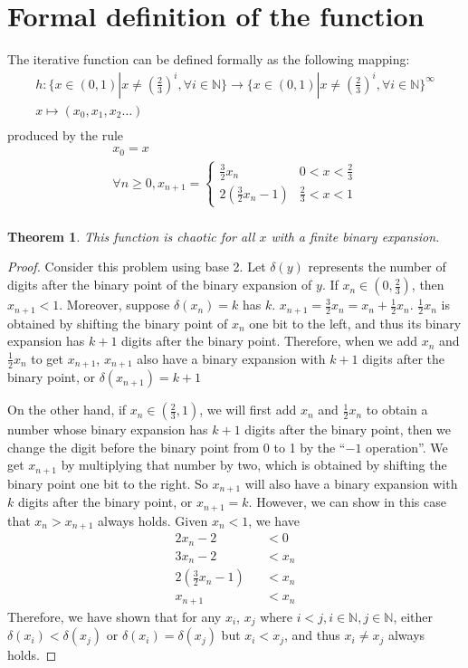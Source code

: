 \documentclass{article}
\newtheorem{theorem}{Theorem}[section]
\theoremstyle{definition}
\theoremstyle{remark}
\begin{document}
\section{Formal definition of the function}
The iterative function can be defined formally as the following mapping:
\begin{gather*}
h:\{x\in (0, 1)| x\not = (\frac{2}{3})^i, \forall i \in \mathbb{N}\} \rightarrow
\{x\in (0, 1)| x\not = (\frac{2}{3})^i, \forall i \in \mathbb{N}\}^{\infty}\\
 x\mapsto (x_0, x_1, x_2 \ldots)\\
\end{gather*}
produced by the rule 
\begin{gather*}
x_0=x\\
\forall n\geq 0, x_{n+1} = 
\begin{cases} 
  \frac{3}{2}x_n & 0< x <\frac{2}{3} \\
  2(\frac{3}{2}x_n-1) & \frac{2}{3}< x<1
\end{cases}\\
\end{gather*}
\begin{theorem}
This function is chaotic for all $x$ with a finite binary expansion.
\end{theorem}
\begin{proof}
Consider this problem using base 2. Let $\delta(y)$ represents the number of digits after the binary point of the binary expansion of $y$. If $x_n\in (0, \frac{2}{3})$, then $x_{n+1}<1$. Moreover, suppose $\delta(x_{n}) = k$ has $k$. $x_{n+1} = \frac{3}{2}x_n = x_n+\frac{1}{2}x_n$. $\frac{1}{2}x_n$ is obtained by shifting the binary point of $x_n$ one bit to the left, and thus its binary expansion has $k+1$ digits after the binary point. Therefore, when we add $x_n$ and $\frac{1}{2}x_n$ to get $x_{n+1}$, $x_{n+1}$ also have a binary expansion with $k+1$ digits after the binary point, or $\delta(x_{n+1}) = k+1$

On the other hand, if $x_n\in(\frac{2}{3}, 1)$, we will first add $x_n$ and $\frac{1}{2}x_n$ to obtain a number whose binary expansion has $k+1$ digits after the binary point, then we change the digit before the binary point from 0 to 1 by the ``$-1$ operation''. We get $x_{n+1}$ by multiplying that number by two, which is obtained by shifting the binary point one bit to the right. So $x_{n+1}$ will also have a binary expansion with $k$ digits after the binary point, or $x_{n+1} = k$. However, we can show in this case that $x_n>x_{n+1}$ always holds. Given $x_n<1$, we have 
\begin{eqnarray*}
2x_n-2&&<0\\
3x_n-2&&<x_n\\
2(\frac{3}{2}x_n-1)&&<x_n\\
x_{n+1}&&<x_n
\end{eqnarray*}
Therefore, we have shown that for any $x_i$, $x_j$ where $i<j, i\in \mathbb{N}, j\in \mathbb{N}$, either $\delta(x_i)<\delta(x_j)$ or $\delta(x_i) = \delta(x_j)$ but $x_i<x_j$, and thus $x_i\not = x_j$ always holds. 
\end{proof}
\end{document}
